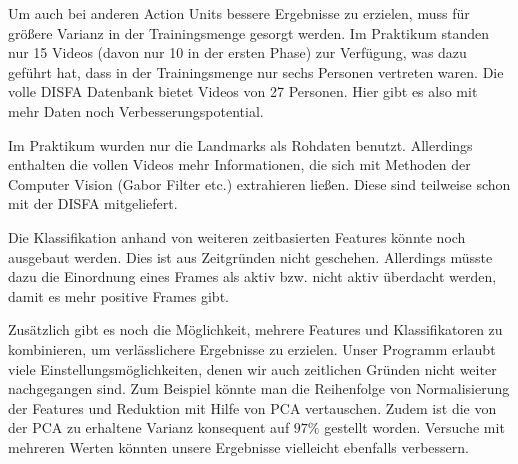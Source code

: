 Um auch bei anderen Action Units bessere Ergebnisse zu erzielen, muss für
größere Varianz in der Trainingsmenge gesorgt werden. Im Praktikum standen nur
15 Videos (davon nur 10 in der ersten Phase) zur Verfügung, was dazu geführt
hat, dass in der Trainingsmenge nur sechs Personen vertreten waren. Die volle
DISFA Datenbank bietet Videos von 27 Personen. Hier gibt es also mit mehr Daten
noch Verbesserungspotential.

Im Praktikum wurden nur die Landmarks als Rohdaten benutzt. Allerdings enthalten
die vollen Videos mehr Informationen, die sich mit Methoden der Computer Vision
(Gabor Filter etc.) extrahieren ließen. Diese sind teilweise schon mit der DISFA mitgeliefert.

Die Klassifikation anhand von weiteren zeitbasierten Features könnte noch ausgebaut
werden. Dies ist aus Zeitgründen nicht geschehen. Allerdings müsste dazu die
Einordnung eines Frames als aktiv bzw. nicht aktiv überdacht werden, damit es
mehr positive Frames gibt.

Zusätzlich gibt es noch die Möglichkeit, mehrere Features und Klassifikatoren zu
kombinieren, um verlässlichere Ergebnisse zu erzielen. Unser Programm erlaubt viele Einstellungsmöglichkeiten, denen wir auch zeitlichen Gründen nicht
weiter nachgegangen sind. Zum Beispiel könnte man die Reihenfolge von
Normalisierung der Features und Reduktion mit Hilfe von PCA vertauschen. Zudem
ist die von der PCA zu erhaltene Varianz konsequent auf $97\%$ gestellt worden. Versuche mit mehreren Werten könnten unsere Ergebnisse vielleicht ebenfalls verbessern.

